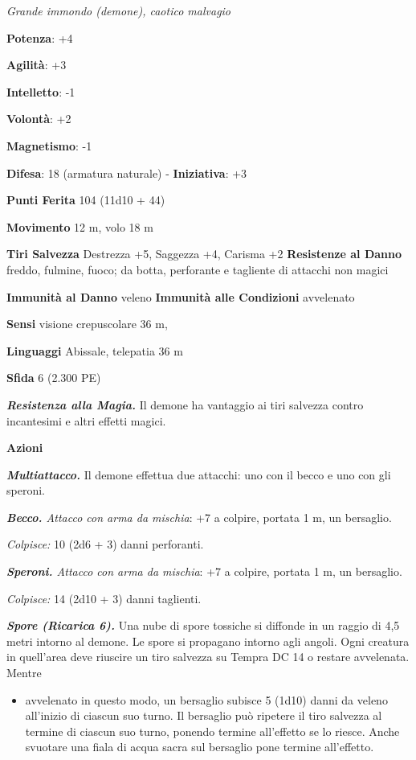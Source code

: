 \begin{multicols}{2}
\emph{Grande immondo (demone), caotico malvagio}

\textbf{Potenza}: +4

\textbf{Agilità}: +3

\textbf{Intelletto}: -1

\textbf{Volontà}: +2

\textbf{Magnetismo}: -1

\textbf{Difesa}: 18 (armatura naturale) - \textbf{Iniziativa}: +3

\textbf{Punti Ferita} 104 (11d10 + 44)

\textbf{Movimento} 12 m, volo 18 m

\textbf{Tiri Salvezza} Destrezza +5, Saggezza +4, Carisma +2
\textbf{Resistenze al Danno} freddo, fulmine, fuoco; da botta,
perforante e tagliente di attacchi non magici

\textbf{Immunità al Danno} veleno \textbf{Immunità alle Condizioni}
avvelenato

\textbf{Sensi} visione crepuscolare 36 m, 

\textbf{Linguaggi} Abissale, telepatia 36 m 

\textbf{Sfida} 6 (2.300 PE)\smallskip

\emph{\textbf{Resistenza alla Magia.}} Il demone ha vantaggio ai tiri
salvezza contro incantesimi e altri effetti magici.

\smallskip\textbf{Azioni}

\emph{\textbf{Multiattacco.}} Il demone effettua due attacchi: uno con
il becco e uno con gli speroni.

\emph{\textbf{Becco.} Attacco con arma da mischia}: +7 a colpire,
portata 1 m, un bersaglio.

\emph{Colpisce:} 10 (2d6 + 3) danni perforanti.

\emph{\textbf{Speroni.} Attacco con arma da mischia}: +7 a colpire,
portata 1 m, un bersaglio.

\emph{Colpisce:} 14 (2d10 + 3) danni taglienti.

\emph{\textbf{Spore (Ricarica 6).}} Una nube di spore tossiche si
diffonde in un raggio di 4,5 metri intorno al demone. Le spore si
propagano intorno agli angoli. Ogni creatura in quell'area deve riuscire
un tiro salvezza su Tempra DC 14 o restare avvelenata. Mentre


\begin{itemize}
\item
  avvelenato in questo modo, un bersaglio subisce 5 (1d10) danni da
  veleno all'inizio di ciascun suo turno. Il bersaglio può ripetere il
  tiro salvezza al termine di ciascun suo turno, ponendo termine
  all'effetto se lo riesce. Anche svuotare una fiala di acqua sacra sul
  bersaglio pone termine all'effetto.
\end{itemize}



\end{multicols}
